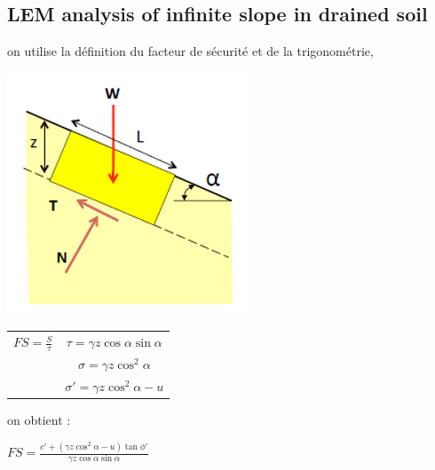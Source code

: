     \subsection{LEM analysis of infinite slope in drained soil}
    
        
        on utilise la définition du facteur de sécurité et de la trigonométrie, 
        
        \begin{multicols}{2}
        
            \begin{flushright}
            \includegraphics[scale=0.8]{Verastegui/images/V17.PNG}
            \end{flushright}
            
            \vfill\null\columnbreak            
            
            \begin{tabular}{c|c}
                    $FS = \frac{S}{\tau}$ \: &  $\tau = \gamma z \cos \alpha \sin \alpha$  \\
                                             &  $\sigma = \gamma z \cos^2 \alpha$  \\
                                             &  $\sigma' = \gamma z \cos^2 \alpha - u$ 
            \end{tabular} 
            
        \end{multicols}

        on obtient : 
                \begin{center}
                $FS = \frac{c'+(\gamma z \cos^2 \alpha - u) \tan \phi'}{\gamma z \cos \alpha \sin \alpha}$
                \end{center}
                
